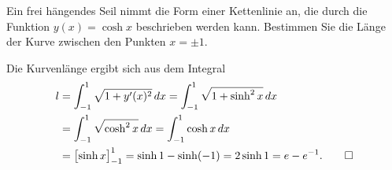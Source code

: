 Ein frei hängendes Seil nimmt die Form einer Kettenlinie an, die durch
die Funktion $y(x)=\cosh x$ beschrieben werden kann.
Bestimmen Sie die Länge der Kurve zwischen den Punkten $x=\pm 1$.

\begin{loesung}
Die Kurvenlänge ergibt sich aus dem Integral
\begin{align*}
l
&=
\int_{-1}^{1} \sqrt{1+y'(x)^2}\,dx
=
\int_{-1}^{1} \sqrt{1+\sinh^2 x}\,dx
\\
&=
\int_{-1}^{1} \sqrt{\cosh^2 x}\,dx
=
\int_{-1}^{1} \cosh x\,dx
\\
&=
\bigl[\sinh x\bigr]_{-1}^1
=
\sinh 1 - \sinh(-1)=2\sinh 1 = e-e^{-1}.
\qedhere
\end{align*}
\end{loesung}

